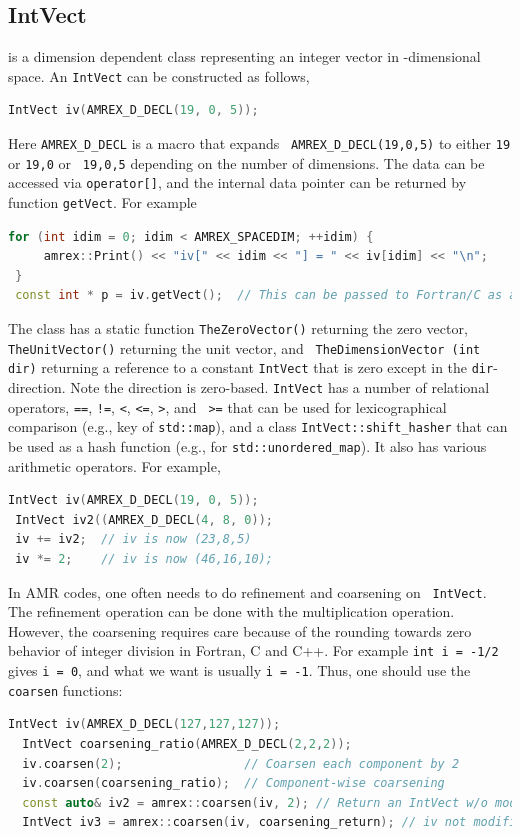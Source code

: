 {\subsection{IntVect}

{} is a dimension dependent class representing an
integer vector in {}-dimensional space.  An
{\tt IntVect} can be constructed as follows,
\begin{lstlisting}[language=cpp]
 IntVect iv(AMREX_D_DECL(19, 0, 5));
\end{lstlisting}
Here {\tt AMREX\_D\_DECL} is a macro that expands {\tt
  AMREX\_D\_DECL(19,0,5)} to either {\tt 19} or {\tt 19,0} or {\tt
  19,0,5} depending on the number of dimensions.  The data can be
accessed via {\tt operator[]}, and the internal data pointer can be
returned by function {\tt getVect}.  For example
\begin{lstlisting}[language=cpp]
 for (int idim = 0; idim < AMREX_SPACEDIM; ++idim) {
     amrex::Print() << "iv[" << idim << "] = " << iv[idim] << "\n";
 }
 const int * p = iv.getVect();  // This can be passed to Fortran/C as an array
\end{lstlisting}

The class has a static function {\tt TheZeroVector()} returning the
zero vector, {\tt TheUnitVector()} returning the unit vector, and {\tt
  TheDimensionVector (int dir)} returning a reference to a constant
{\tt IntVect} that is zero except in the {\tt dir}-direction.  Note
the direction is zero-based.  {\tt IntVect} has a number of relational
operators, {\tt ==}, {\tt !=}, {\tt <}, {\tt <=}, {\tt >}, and {\tt
  >=} that can be used for lexicographical comparison (e.g., key of
{\tt std::map}), and a class {\tt IntVect::shift\_hasher} that can be
used as a hash function (e.g., for {\tt std::unordered\_map}).  It
also has various arithmetic operators.  For example,
\begin{lstlisting}[language=cpp]
 IntVect iv(AMREX_D_DECL(19, 0, 5));
 IntVect iv2((AMREX_D_DECL(4, 8, 0));
 iv += iv2;  // iv is now (23,8,5)
 iv *= 2;    // iv is now (46,16,10);
\end{lstlisting}

In AMR codes, one often needs to do refinement and coarsening on {\tt
  IntVect}.  The refinement operation can be done with the
multiplication operation.  However, the coarsening requires care
because of the rounding towards zero behavior of integer division in
Fortran, C and C++.  For example {\tt int i = -1/2} gives {\tt i =
  0}, and what we want is usually {\tt i = -1}.  Thus, one should use
the {\tt coarsen} functions:
\begin{lstlisting}[language=cpp]
  IntVect iv(AMREX_D_DECL(127,127,127));
  IntVect coarsening_ratio(AMREX_D_DECL(2,2,2));
  iv.coarsen(2);                 // Coarsen each component by 2
  iv.coarsen(coarsening_ratio);  // Component-wise coarsening
  const auto& iv2 = amrex::coarsen(iv, 2); // Return an IntVect w/o modifying iv
  IntVect iv3 = amrex::coarsen(iv, coarsening_return); // iv not modified
\end{lstlisting}

}
